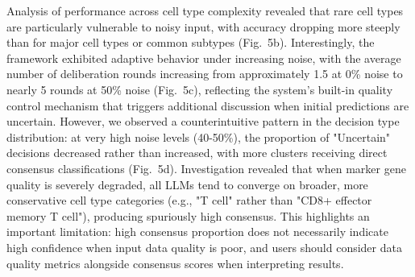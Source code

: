 \documentclass[pdflatex,sn-nature]{sn-jnl}%
\theoremstyle{thmstyleone}%
\theoremstyle{thmstyletwo}%
\theoremstyle{thmstylethree}%
\begin{document}
Analysis of performance across cell type complexity revealed that rare cell types are particularly vulnerable to noisy input, with accuracy dropping more steeply than for major cell types or common subtypes (Fig.~5b). Interestingly, the framework exhibited adaptive behavior under increasing noise, with the average number of deliberation rounds increasing from approximately 1.5 at 0\% noise to nearly 5 rounds at 50\% noise (Fig.~5c), reflecting the system's built-in quality control mechanism that triggers additional discussion when initial predictions are uncertain. However, we observed a counterintuitive pattern in the decision type distribution: at very high noise levels (40-50\%), the proportion of "Uncertain" decisions decreased rather than increased, with more clusters receiving direct consensus classifications (Fig.~5d). Investigation revealed that when marker gene quality is severely degraded, all LLMs tend to converge on broader, more conservative cell type categories (e.g., "T cell" rather than "CD8+ effector memory T cell"), producing spuriously high consensus. This highlights an important limitation: high consensus proportion does not necessarily indicate high confidence when input data quality is poor, and users should consider data quality metrics alongside consensus scores when interpreting results.
\end{document}
